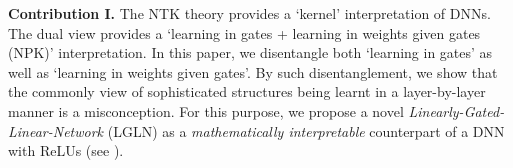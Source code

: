 









\textbf{Contribution I.} The NTK theory provides a `kernel' interpretation of DNNs. The dual view provides a `learning in gates + learning in weights given gates (NPK)'  interpretation. In this paper, we disentangle both `learning in gates'  as well as  `learning in weights given gates'. By such disentanglement, we show that the commonly view of sophisticated structures being learnt in a layer-by-layer manner is a misconception. For this purpose, we propose a novel \emph{Linearly-Gated-Linear-Network} (LGLN) as a \emph{mathematically interpretable} counterpart of a DNN with ReLUs (see ). 

